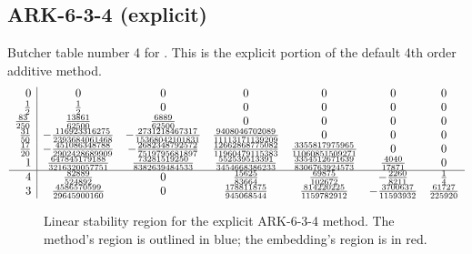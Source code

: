 \documentclass[letterpaper,10pt,english]{sphinxmanual}
\begin{document}
\subsection{ARK-6-3-4 (explicit)}
\label{Butcher:butcher-ark-6-3-4-e}\label{Butcher:ark-6-3-4-explicit}
Butcher table number 4
for {\hyperref[c_interface/User_callable:ARKodeSetERKTableNum]{}}.  This is
the explicit portion of the default 4th order additive method.
\begin{gather}
\begin{split}\begin{array}{r|cccccc}
  0 & 0 & 0 & 0 & 0 & 0 & 0 \\
  \frac12 & \frac12 & 0 & 0 & 0 & 0 & 0 \\
  \frac{83}{250} & \frac{13861}{62500} & \frac{6889}{62500} & 0 & 0 & 0 & 0 \\
  \frac{31}{50} & -\frac{116923316275}{2393684061468} & -\frac{2731218467317}{15368042101831} & \frac{9408046702089}{11113171139209} & 0 & 0 & 0 \\
  \frac{17}{20} & -\frac{451086348788}{2902428689909} & -\frac{2682348792572}{7519795681897} & \frac{12662868775082}{11960479115383} & \frac{3355817975965}{11060851509271} & 0 & 0 \\
  1 & \frac{647845179188}{3216320057751} & \frac{73281519250}{8382639484533} & \frac{552539513391}{3454668386233} & \frac{3354512671639}{8306763924573} & \frac{4040}{17871} & 0 \\
  \hline
  4 & \frac{82889}{524892} & 0 & \frac{15625}{83664} & \frac{69875}{102672} & -\frac{2260}{8211} & \frac14 \\
  3 & \frac{4586570599}{29645900160} & 0 & \frac{178811875}{945068544} & \frac{814220225}{1159782912} & -\frac{3700637}{11593932} & \frac{61727}{225920}
\end{array}\end{split}\notag
\end{gather}\begin{figure}[htbp]
\centering
\capstart

\caption{Linear stability region for the explicit ARK-6-3-4 method.  The method's
region is outlined in blue; the embedding's region is in red.}\end{figure}
\end{document}
